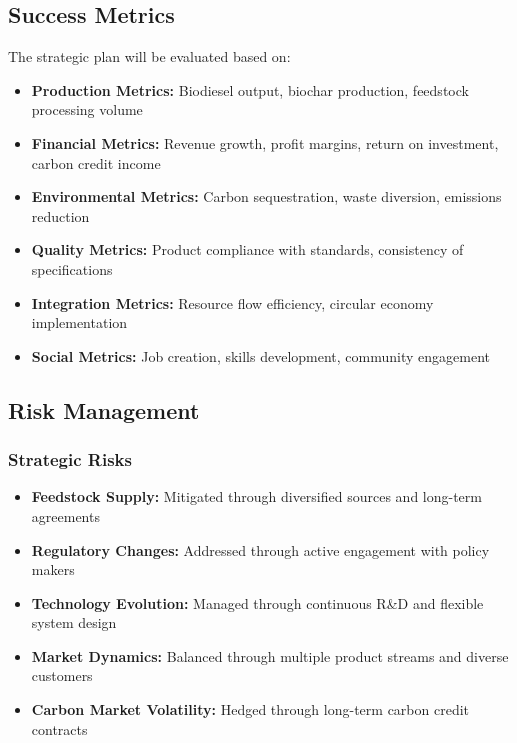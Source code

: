 \subsection{Success Metrics}

The strategic plan will be evaluated based on:

\begin{itemize}
    \item \textbf{Production Metrics:} Biodiesel output, biochar production, feedstock processing volume
    \item \textbf{Financial Metrics:} Revenue growth, profit margins, return on investment, carbon credit income
    \item \textbf{Environmental Metrics:} Carbon sequestration, waste diversion, emissions reduction
    \item \textbf{Quality Metrics:} Product compliance with standards, consistency of specifications
    \item \textbf{Integration Metrics:} Resource flow efficiency, circular economy implementation
    \item \textbf{Social Metrics:} Job creation, skills development, community engagement
\end{itemize}

\subsection{Risk Management}

\subsubsection{Strategic Risks}
\begin{itemize}
    \item \textbf{Feedstock Supply:} Mitigated through diversified sources and long-term agreements
    \item \textbf{Regulatory Changes:} Addressed through active engagement with policy makers
    \item \textbf{Technology Evolution:} Managed through continuous R\&D and flexible system design
    \item \textbf{Market Dynamics:} Balanced through multiple product streams and diverse customers
    \item \textbf{Carbon Market Volatility:} Hedged through long-term carbon credit contracts
\end{itemize}

